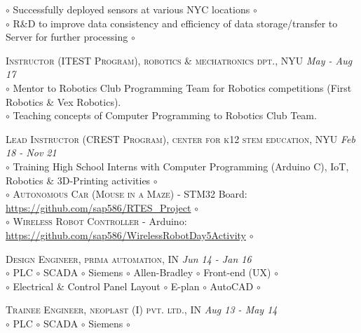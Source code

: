 \documentclass[a4paper]{article}
\begin{document}
		{	$\circ$ Successfully deployed sensors at various NYC locations $\circ$																					}	\\
		{	$\circ$ R\&D to improve data consistency and efficiency of data storage/transfer to Server for further processing $\circ$												}	\\
%
\begin{spacing}{0.1}
\end{spacing}
\textsc	{	Instructor (ITEST Program), robotics \& mechatronics dpt., NYU																				} \hfill \emph {May - Aug 17	}	\\
		{	$\circ$ Mentor to Robotics Club Programming Team for Robotics competitions (First Robotics \& Vex Robotics).												}	\\
		{	$\circ$ Teaching concepts of Computer Programming to Robotics Club Team.																		}	\\
%
\begin{spacing}{0.1}
\end{spacing}
\textsc	{	Lead Instructor (CREST Program), center for k12 stem education, NYU																			} \hfill \emph {Feb 18 - Nov 21	}	\\
		{	$\circ$ Training High School Interns with Computer Programming (Arduino C), IoT, Robotics \& 3D-Printing activities $\circ$											}	\\
		{	$\circ$ \textsc{Autonomous Car (Mouse in a Maze)} - STM32 Board: \href{https://github.com/sap586/RTES_Project}{https://github.com/sap586/RTES\_Project} $\circ$			}	\\
		{	$\circ$ \textsc{Wireless Robot Controller} - Arduino: \href{https://github.com/sap586/WirelessRobotDay5Activity}{https://github.com/sap586/WirelessRobotDay5Activity} $\circ$	}	\\
%
\begin{spacing}{0.1}
\end{spacing}
\textsc	{	Design Engineer, prima automation, IN																							} \hfill \emph {Jun 14 - Jan 16	}	\\
		{	$\circ$ PLC $\circ$ SCADA $\circ$ Siemens $\circ$ Allen-Bradley $\circ$ Front-end (UX) $\circ$																	}	\\													
		{	$\circ$ Electrical \& Control Panel Layout $\circ$ E-plan $\circ$ AutoCAD $\circ$																}	\\
%
\begin{spacing}{0.1}
\end{spacing}
 \textsc	{	Trainee Engineer, neoplast (I) pvt. ltd., IN																						} \hfill \emph {Aug 13 - May 14	}	\\
 		{	$\circ$ PLC $\circ$ SCADA $\circ$ Siemens $\circ$																					}	\\
%
\end{document}
